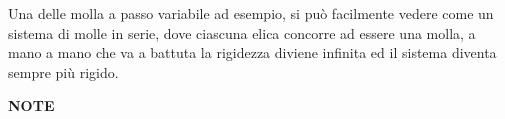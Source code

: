 \documentclass[a4paper, 15pt]{article}
\begin{document}
\begin{adjustwidth}{2in}{}
Una delle molla a passo variabile ad esempio, si può facilmente vedere come un sistema di molle in serie, dove ciascuna elica concorre ad essere una molla, a mano a mano che va a battuta la rigidezza diviene infinita ed il sistema diventa sempre più rigido. 
































\newpage
\textbf{{\LARGE NOTE}}

%		
\end{adjustwidth}
\end{document}

